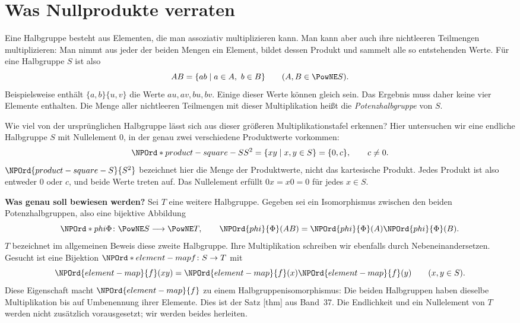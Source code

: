\chapter*{Was Nullprodukte verraten}
\hypertarget{nullproducts.reading}{}

Eine Halbgruppe besteht aus Elementen, die man assoziativ multiplizieren
kann. Man kann aber auch ihre nichtleeren Teilmengen multiplizieren:
Man nimmt aus jeder der beiden Mengen ein Element, bildet dessen Produkt
und sammelt alle so entstehenden Werte. Für eine Halbgruppe \(S\) ist also
\[
 AB=\{ab\mid a\in A,\ b\in B\}\qquad(A,B\in\PowNE S).
\]
Beispielsweise enthält \(\{a,b\}\{u,v\}\) die Werte \(au,av,bu,bv\).
Einige dieser Werte können gleich sein. Das Ergebnis muss daher keine
vier Elemente enthalten. Die Menge aller nichtleeren Teilmengen mit
dieser Multiplikation heißt die \emph{Potenzhalbgruppe} von \(S\).

Wie viel von der ursprünglichen Halbgruppe lässt sich aus dieser
größeren Multiplikationstafel erkennen? Hier untersuchen wir eine
endliche Halbgruppe \(S\) mit Nullelement \(0\), in der genau zwei
verschiedene Produktwerte vorkommen:
\[
 \NPOrd*{product-square-S}{S^2}=\{xy\mid x,y\in S\}=\{0,c\},\qquad c\ne0.
\]
\(\NPOrd{product-square-S}{S^2}\) bezeichnet hier die Menge der Produktwerte, nicht das kartesische
Produkt. Jedes Produkt ist also entweder \(0\) oder \(c\), und beide
Werte treten auf. Das Nullelement erfüllt \(0x=x0=0\) für jedes \(x\in S\).

\medskip\noindent\textbf{Was genau soll bewiesen werden?}
Sei \(T\) eine weitere Halbgruppe. Gegeben sei ein Isomorphismus
zwischen den beiden Potenzhalbgruppen, also eine bijektive Abbildung
\[
 \NPOrd*{phi}{\Phi}\colon\PowNE S\longrightarrow\PowNE T,\qquad
 \NPOrd{phi}{\Phi}(AB)=\NPOrd{phi}{\Phi}(A)\NPOrd{phi}{\Phi}(B).
\]
\(T\) bezeichnet im allgemeinen Beweis diese zweite Halbgruppe. Ihre
Multiplikation schreiben wir ebenfalls durch Nebeneinandersetzen.
Gesucht ist eine Bijektion \(\NPOrd*{element-map}{f}\colon S\to T\) mit
\[
 \NPOrd{element-map}{f}(xy)=\NPOrd{element-map}{f}(x)\NPOrd{element-map}{f}(y)\qquad(x,y\in S).
\]
Diese Eigenschaft macht \(\NPOrd{element-map}{f}\) zu einem Halbgruppenisomorphismus:
Die beiden Halbgruppen haben dieselbe Multiplikation bis auf Umbenennung
ihrer Elemente. Dies ist der Satz
[thm] aus Band~37.
Die Endlichkeit und ein Nullelement von \(T\) werden nicht zusätzlich
vorausgesetzt; wir werden beides herleiten.

